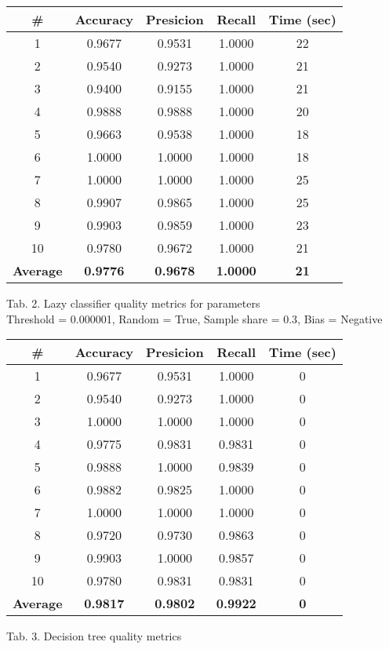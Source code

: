 \documentclass{article}
\begin{document}
\begin{center}
    \begin{tabular}{|c|c|c|c|c|}
        \hline
        \# & \textbf{Accuracy} & \textbf{Presicion} & \textbf{Recall} & \textbf{Time (sec)} \\
        \hline
        1 & 0.9677 & 0.9531 & 1.0000 & 22 \\
        2 & 0.9540 & 0.9273 & 1.0000 & 21 \\
        3 & 0.9400 & 0.9155 & 1.0000 & 21 \\
        4 & 0.9888 & 0.9888 & 1.0000 & 20 \\
        5 & 0.9663 & 0.9538 & 1.0000 & 18 \\
        6 & 1.0000 & 1.0000 & 1.0000 & 18 \\
        7 & 1.0000 & 1.0000 & 1.0000 & 25 \\
        8 & 0.9907 & 0.9865 & 1.0000 & 25 \\
        9 & 0.9903 & 0.9859 & 1.0000 & 23 \\
        10 & 0.9780 & 0.9672 & 1.0000 & 21 \\
        \hline
        \textbf{Average} & \textbf{0.9776} & \textbf{0.9678} & \textbf{1.0000} & \textbf{21} \\
        \hline
    \end{tabular}
    
    Tab. 2. Lazy classifier quality metrics for parameters \\Threshold = 0.000001, Random = True, Sample share = 0.3, Bias = Negative
\end{center}

\begin{center}
    \begin{tabular}{|c|c|c|c|c|}
        \hline
        \# & \textbf{Accuracy} & \textbf{Presicion} & \textbf{Recall} & \textbf{Time (sec)} \\
        \hline
        1	& 0.9677	& 0.9531	& 1.0000	& 0 \\
        2	& 0.9540	& 0.9273	& 1.0000	& 0 \\
        3	& 1.0000	& 1.0000	& 1.0000	& 0 \\
        4	& 0.9775	& 0.9831	& 0.9831	& 0 \\
        5	& 0.9888	& 1.0000	& 0.9839	& 0 \\
        6	& 0.9882	& 0.9825	& 1.0000	& 0 \\
        7	& 1.0000	& 1.0000	& 1.0000	& 0 \\
        8	& 0.9720	& 0.9730	& 0.9863	& 0 \\
        9	& 0.9903	& 1.0000	& 0.9857	& 0 \\
        10	& 0.9780	& 0.9831	& 0.9831	& 0 \\
        \hline
        \textbf{Average} & \textbf{0.9817} & \textbf{0.9802} & \textbf{0.9922} & \textbf{0} \\
        \hline
    \end{tabular}
    
    Tab. 3. Decision tree quality metrics
\end{center}
\end{document}
